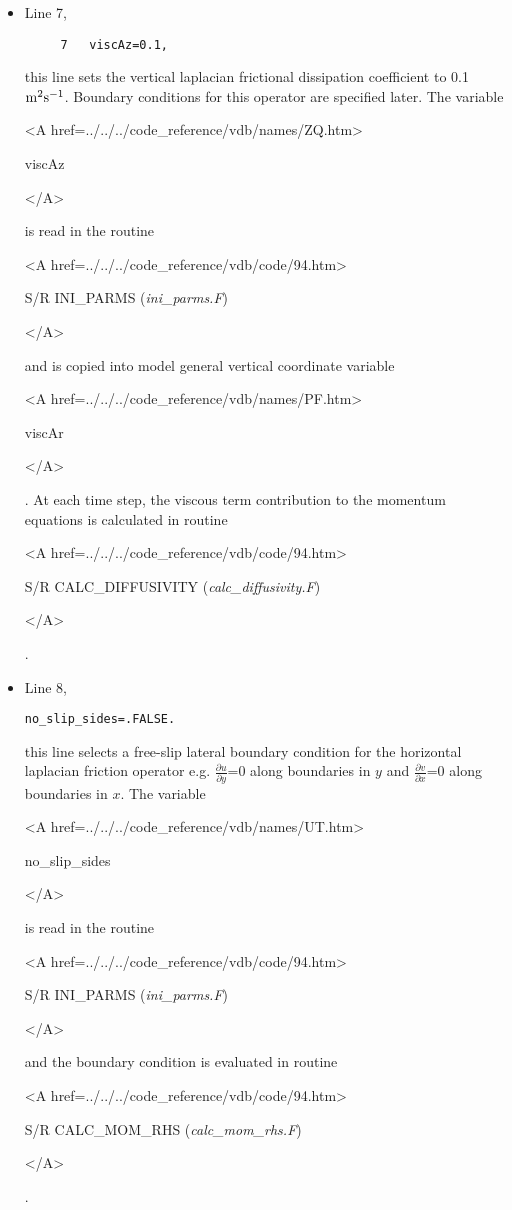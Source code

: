 \begin{itemize}
\item Line 7,
\begin{verbatim}
     7	 viscAz=0.1,
\end{verbatim}
this line sets the vertical laplacian frictional dissipation coefficient to
0.1 ${\rm m^{2}s^{-1}}$. Boundary conditions
for this operator are specified later.
The variable 
{\bf 
\begin{rawhtml} <A href=../../../code_reference/vdb/names/ZQ.htm> \end{rawhtml}
viscAz
\begin{rawhtml} </A>\end{rawhtml}
}
is read in the routine
{\it
\begin{rawhtml} <A href=../../../code_reference/vdb/code/94.htm> \end{rawhtml}
S/R INI\_PARMS ({\it ini\_parms.F})
\begin{rawhtml} </A>\end{rawhtml}
}
and is copied into model general vertical coordinate variable 
{\bf 
\begin{rawhtml} <A href=../../../code_reference/vdb/names/PF.htm> \end{rawhtml}
viscAr
\begin{rawhtml} </A>\end{rawhtml}
}. At each time step, the viscous term contribution to the momentum equations
is calculated in routine
{\it 
\begin{rawhtml} <A href=../../../code_reference/vdb/code/94.htm> \end{rawhtml}
S/R CALC\_DIFFUSIVITY ({\it calc\_diffusivity.F})
\begin{rawhtml} </A>\end{rawhtml}
}.


\item Line 8,
\begin{verbatim}
no_slip_sides=.FALSE.
\end{verbatim}
this line selects a free-slip lateral boundary condition for
the horizontal laplacian friction operator 
e.g. $\frac{\partial u}{\partial y}$=0 along boundaries in $y$ and
$\frac{\partial v}{\partial x}$=0 along boundaries in $x$.
The variable
{\bf
\begin{rawhtml} <A href=../../../code_reference/vdb/names/UT.htm> \end{rawhtml}
no\_slip\_sides
\begin{rawhtml} </A>\end{rawhtml}
}
is read in the routine
{\it
\begin{rawhtml} <A href=../../../code_reference/vdb/code/94.htm> \end{rawhtml}
S/R INI\_PARMS ({\it ini\_parms.F})
\begin{rawhtml} </A>\end{rawhtml}
} and the boundary condition is evaluated in routine
{\it 
\begin{rawhtml} <A href=../../../code_reference/vdb/code/94.htm> \end{rawhtml}
S/R CALC\_MOM\_RHS ({\it calc\_mom\_rhs.F})
\begin{rawhtml} </A>\end{rawhtml}
}.



\end{itemize}
